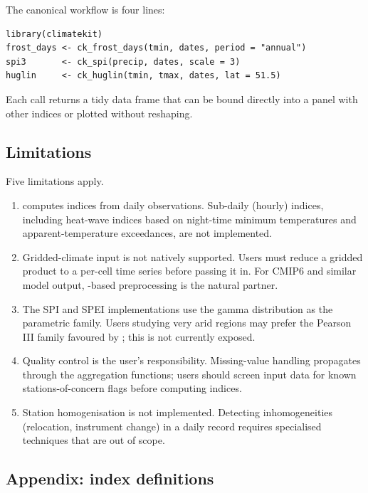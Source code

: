 The canonical workflow is four lines:

\begin{verbatim}
library(climatekit)
frost_days <- ck_frost_days(tmin, dates, period = "annual")
spi3       <- ck_spi(precip, dates, scale = 3)
huglin     <- ck_huglin(tmin, tmax, dates, lat = 51.5)
\end{verbatim}

Each call returns a tidy data frame that can be bound directly into a
panel with other indices or plotted without reshaping.

\subsection{Limitations}\label{limitations}

Five limitations apply.

\begin{enumerate}
\def\labelenumi{\arabic{enumi}.}
\tightlist
\item
   computes indices from daily observations.
  Sub-daily (hourly) indices, including heat-wave indices based on
  night-time minimum temperatures and apparent-temperature exceedances,
  are not implemented.
\item
  Gridded-climate input is not natively supported. Users must reduce a
  gridded product to a per-cell time series before passing it in. For
  CMIP6 and similar model output, -based preprocessing is
  the natural partner.
\item
  The SPI and SPEI implementations use the gamma distribution as the
  parametric family. Users studying very arid regions may prefer the
  Pearson III family favoured by \citet{vicente2010multiscalar}; this is
  not currently exposed.
\item
  Quality control is the user's responsibility. Missing-value handling
  propagates  through the aggregation functions; users should
  screen input data for known stations-of-concern flags before computing
  indices.
\item
  Station homogenisation is not implemented. Detecting inhomogeneities
  (relocation, instrument change) in a daily record requires specialised
  techniques that are out of scope.
\end{enumerate}

\FloatBarrier

\subsection{Appendix: index
definitions}\label{appendix-index-definitions}

